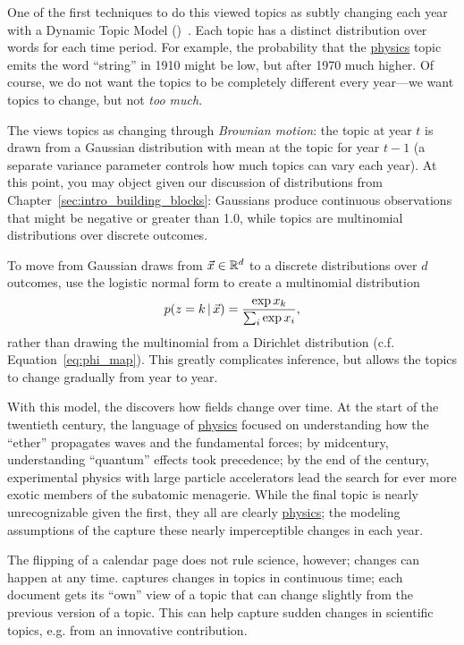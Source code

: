One of the first techniques to do this viewed topics as subtly
changing each year with a Dynamic Topic
Model ()~\citep{blei-06b}.  Each topic has a distinct
distribution over words for each time period.  For example, the probability that
the \underline{physics} topic emits the word ``string'' in 1910 might be low,
but after 1970 much higher.  Of course, we do not want the topics to be completely
different every year---we want topics to change, but not \emph{too
  much}.

The  views topics as changing through \emph{Brownian
  motion}: the topic at year $t$ is drawn from a Gaussian distribution
with mean at the topic for year $t-1$ (a separate variance parameter
controls how much topics can vary each year).  At this point, you may
object given our discussion of distributions from
Chapter~\ref{sec:intro_building_blocks}: Gaussians produce continuous
observations that might be negative or greater than 1.0, while topics are multinomial distributions over discrete outcomes.

To move from Gaussian draws from $\vec x \in \mathbb{R}^d$ to a discrete distributions
over $d$ outcomes, \citet{blei-06b} use the logistic normal form to
create a multinomial distribution
\begin{equation}
p(z=k \, | \, \vec x)  = \frac{\exp{x_k}}{\sum_i \exp{x_i}},
\end{equation}
rather than drawing the multinomial from a Dirichlet distribution
(c.f. Equation~\ref{eq:phi_map}).
This greatly complicates inference, but allows the topics to change
gradually from year to year.

With this model, the  discovers how fields change over
time.  At the start of the twentieth century, the language of
\underline{physics} focused on understanding how the ``ether''
propagates waves and the fundamental forces; by midcentury,
understanding ``quantum'' effects took precedence; by the end of the
century, experimental physics with large particle accelerators lead
the search for ever more exotic members of the subatomic menagerie.
While the final topic is nearly unrecognizable given the first, they
all are clearly \underline{physics}; the modeling assumptions of the
 capture these nearly imperceptible changes in each year.

The flipping of a calendar page does not rule science, however;
changes can happen at any time.  \citet{wang-08} captures changes in
topics in continuous time; each document gets its ``own'' view of a
topic that can change slightly from the previous version of a topic.
This can help capture sudden changes in scientific topics, e.g. from
an innovative contribution.

